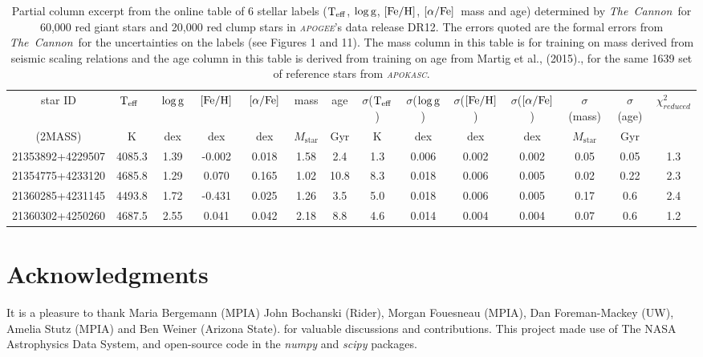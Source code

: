 \documentclass[12pt, preprint]{aastex}
\newcommand{\project}[1]{\textsl{#1}}
\newcommand{\tc}{\project{The~Cannon}}
\newcommand{\apogee}{\project{\textsc{apogee}}}
\newcommand{\apokasc}{\project{\textsc{apokasc}}}
\newcommand{\teff}{\mbox{$\rm T_{eff}$}}
\newcommand{\feh}{\mbox{$\rm [Fe/H]$}}
\newcommand{\alphafe}{\mbox{$\rm [\alpha/Fe]$}}
\newcommand{\logg}{\mbox{$\rm \log g$}}
\begin{document}
\begin{table}[h!]
\tiny{
\centering
\caption{Partial column excerpt from the online table of 6 stellar labels (\teff, \logg, \feh, \alphafe\ mass and age) determined by \tc\ for 60,000 red giant stars and 20,000 red clump stars in \apogee 's data release DR12. The errors quoted are the formal errors from \tc\ for the uncertainties on the labels (see Figures 1 and 11). The mass column in this table is for training on mass derived from seismic scaling relations and the age column in this table is derived from training on age from Martig et al., (2015)., for the same 1639 set of reference stars from \apokasc. } 

\vspace{10pt}
\begin{tabular}{| c | c | c |  c | c | c |  c | c | c | c | c | c | c | c |} %
\hline
\tiny{star ID}  & \teff\ & \logg\ & \feh\ & \alphafe\ & mass & \tiny{age} & $\sigma$(\teff) & $\sigma$(\logg) & $\sigma$(\feh) & $\sigma$(\alphafe) & $\sigma$(mass) & $\sigma$(age) & $\chi_{reduced}^2$  \\
\tiny{(2MASS)} & K & dex &  dex  & dex & $ M_{\mbox{star}}$ & Gyr & K & dex  & dex & dex &$ M_{\mbox{star}}$ & Gyr  & \\    
\hline
\tiny{21353892+4229507} & 4085.3 & 1.39  & -0.002  & 0.018 & 1.58  & 2.4 & 1.3 & 0.006 & 0.002 & 0.002 &  0.05 & 0.05 &  1.3 \\
\tiny{21354775+4233120} & 4685.8 & 1.29 & 0.070  & 0.165 & 1.02  & 10.8 &  8.3  & 0.018 & 0.006 & 0.005 &  0.02 &  0.22 & 2.3\\
\tiny{21360285+4231145} & 4493.8 & 1.72  & -0.431  & 0.025 &  1.26  & 3.5 & 5.0 & 0.018 & 0.006 & 0.005 & 0.17 & 0.6 & 2.4 \\
\tiny{21360302+4250260} & 4687.5 & 2.55  & 0.041 & 0.042 & 2.18  & 8.8 & 4.6    & 0.014 & 0.004 & 0.004 & 0.07 & 0.6 & 1.2\\
\hline
\end{tabular}
\label{tab:online} }
\end{table}



\section*{Acknowledgments}
It is a pleasure to thank Maria Bergemann (MPIA)
  John Bochanski (Rider), Morgan Fouesneau (MPIA),
  Dan Foreman-Mackey (UW), Amelia Stutz (MPIA) and Ben Weiner (Arizona State).
for valuable discussions and contributions.
This project made use of
  The NASA Astrophysics Data System,
  and open-source code in the \project{numpy} and \project{scipy} packages.
  
\end{document}
